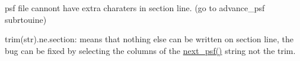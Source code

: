 
\begin{DoxyRefList}
\item[\label{bug__bug000001}%
\Hypertarget{bug__bug000001}%
Module \hyperlink{namespacemolreader}{molreader} ]psf file cannont have extra charaters in \textquotesingle{}section\textquotesingle{} line. (go to advance\+\_\+psf subrtouine)  
\item[\label{bug__bug000002}%
\Hypertarget{bug__bug000002}%
Subprogram \hyperlink{namespacemolreader_a7a4cb6436916cd4b8ee0341d528e9c73}{molreader\+:\+:advance\+\_\+psf} (section, nrecord)]trim(str).ne.\textquotesingle{}section\textquotesingle{}\+: means that nothing else can be written on section line, the bug can be fixed by selecting the columns of the \hyperlink{namespacemolreader_ac6b85a406b7ebd0810f0d63beeeda783}{next\+\_\+psf()} string not the trim. 
\end{DoxyRefList}